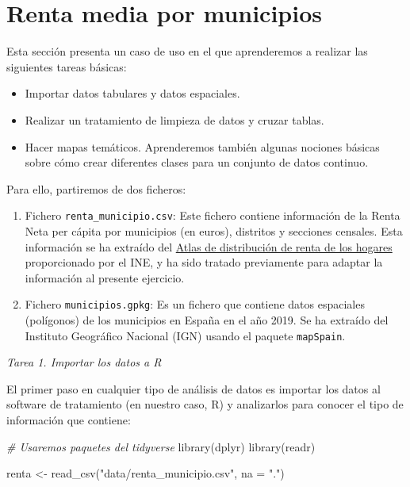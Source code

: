 \documentclass[
]{book}
\newenvironment{Shaded}{\begin{snugshade}}{\end{snugshade}}
\newcommand{\AttributeTok}[1]{\textcolor[rgb]{0.77,0.63,0.00}{#1}}
\newcommand{\CommentTok}[1]{\textcolor[rgb]{0.56,0.35,0.01}{\textit{#1}}}
\newcommand{\FunctionTok}[1]{\textcolor[rgb]{0.00,0.00,0.00}{#1}}
\newcommand{\NormalTok}[1]{#1}
\newcommand{\OtherTok}[1]{\textcolor[rgb]{0.56,0.35,0.01}{#1}}
\newcommand{\StringTok}[1]{\textcolor[rgb]{0.31,0.60,0.02}{#1}}
\begin{document}
\hypertarget{renta-media-por-municipios}{%
\section{Renta media por municipios}\label{renta-media-por-municipios}}

Esta sección presenta un caso de uso en el que aprenderemos a realizar las
siguientes tareas básicas:

\begin{itemize}
\item
  Importar datos tabulares y datos espaciales.
\item
  Realizar un tratamiento de limpieza de datos y cruzar tablas.
\item
  Hacer mapas temáticos. Aprenderemos también algunas nociones básicas sobre
  cómo crear diferentes clases para un conjunto de datos continuo.
\end{itemize}

Para ello, partiremos de dos ficheros:

\begin{enumerate}
\def\labelenumi{\arabic{enumi}.}
\item
  Fichero \texttt{renta\_municipio.csv}: Este fichero contiene información de la Renta
  Neta per cápita por municipios (en euros), distritos y secciones censales.
  Esta información se ha extraído del \href{https://www.ine.es/experimental/atlas/experimental_atlas.htm}{Atlas de distribución de renta de los
  hogares}
  proporcionado por el INE, y ha sido tratado previamente para adaptar la
  información al presente ejercicio.
\item
  Fichero \texttt{municipios.gpkg}: Es un fichero que contiene datos espaciales
  (polígonos) de los municipios en España en el año 2019. Se ha extraído del
  Instituto Geográfico Nacional (IGN) usando el paquete \texttt{mapSpain}.
\end{enumerate}

\emph{Tarea 1. Importar los datos a R}

El primer paso en cualquier tipo de análisis de datos es importar los datos al
software de tratamiento (en nuestro caso, R) y analizarlos para conocer el tipo
de información que contiene:

\begin{Shaded}
\begin{Highlighting}[]
\CommentTok{\# Usaremos paquetes del tidyverse}
\FunctionTok{library}\NormalTok{(dplyr)}
\FunctionTok{library}\NormalTok{(readr)}

\NormalTok{renta }\OtherTok{\textless{}{-}} \FunctionTok{read\_csv}\NormalTok{(}\StringTok{"data/renta\_municipio.csv"}\NormalTok{, }\AttributeTok{na =} \StringTok{"."}\NormalTok{)}
\end{Highlighting}
\end{Shaded}
\end{document}
